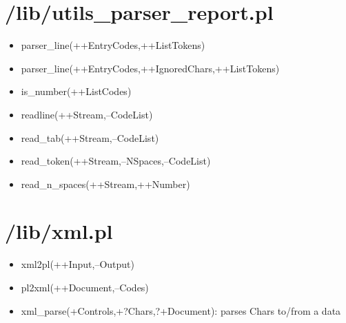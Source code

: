 \section{/lib/utils\_parser\_report.pl}
%
\begin{itemize}
\item parser\_line(++EntryCodes,++ListTokens)
\item parser\_line(++EntryCodes,++IgnoredChars,++ListTokens)
\item is\_number(++ListCodes)
\item readline(++Stream,--CodeList)
\item read\_tab(++Stream,--CodeList)
\item read\_token(++Stream,--NSpaces,--CodeList)
\item read\_n\_spaces(++Stream,++Number)
\end{itemize}



\section{/lib/xml.pl}
%
\begin{itemize}
\item xml2pl(++Input,--Output)
\item pl2xml(++Document,--Codes)
\item  xml\_parse({+Controls},+?Chars,?+Document): parses Chars to/from a data
\end{itemize}

